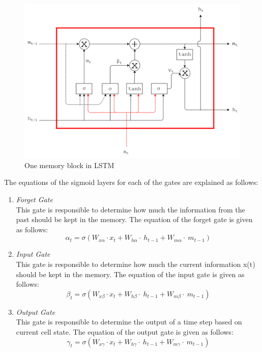 \begin{figure}
	\centering
	\includegraphics[width=1.0\linewidth]{images/lstm}
	\caption{One memory block in LSTM~\citep{skripsiwahid}}
	\label{fig:lstm}
\end{figure}

The equations of the sigmoid layers for each of the gates are explained as follows:
\begin{enumerate}
	\item \textit{Forget Gate}\\
	This gate is responsible to determine how much the information from the past should be kept in the memory. The equation of the forget gate is given as follows:
	\begin{equation}\label{eq:forget_lstm}
	\alpha_{t}=\sigma(W_{x\alpha}\cdot x_{t}+W_{h\alpha}\cdot~h_{t-1}+W_{m\alpha}\cdot~m_{t-1})
	\end{equation}
	
	\item \textit{Input Gate}\\
	This gate is responsible to determine how much the current information x(t) should be kept in the memory. The equation of the input gate is given as follows:
	\begin{equation}\label{eq:input_lstm}
	\beta_{t}=\sigma(W_{x\beta}\cdot x_{t}+W_{h\beta}\cdot~h_{t-1}+W_{m\beta}\cdot~m_{t-1})
	\end{equation}
	
	\item \textit{Output Gate}\\
	This gate is responsible to determine the output of a time step based on current cell state. The equation of the output gate is given as follows:
	\begin{equation}\label{eq:output_lstm}
	\gamma_{t}=\sigma(W_{x\gamma}\cdot x_{t}+W_{h\gamma}\cdot~h_{t-1}+W_{m\gamma}\cdot~m_{t-1})
	\end{equation}
	
\end{enumerate}

